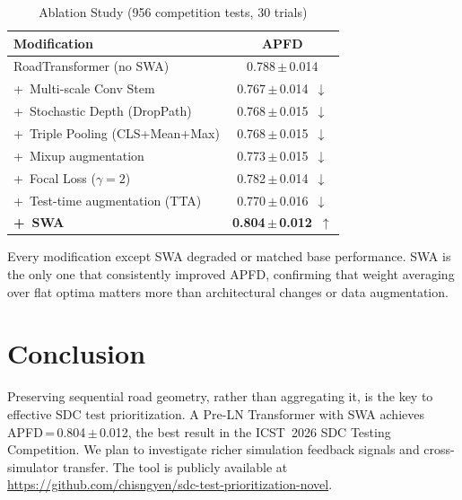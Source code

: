 \documentclass[conference]{IEEEtran}
\newcommand{\softred}[1]{\textcolor{red!70!black}{#1}}
\newcommand{\softgreen}[1]{\textcolor{green!60!black}{#1}}
\begin{document}
\begin{table}[t]
\caption{Ablation Study (956 competition tests, 30 trials)}
\vspace{-4pt}
\begin{center}{\small
\setlength{\tabcolsep}{3pt}
\begin{tabular}{lc}
\toprule
\textbf{Modification} & \textbf{APFD} \\
\midrule
RoadTransformer (no SWA)        & 0.788\,$\pm$\,0.014 \\
\midrule
+~Multi-scale Conv Stem         & \softred{0.767\,$\pm$\,0.014~$\downarrow$} \\
+~Stochastic Depth (DropPath)   & \softred{0.768\,$\pm$\,0.015~$\downarrow$} \\
+~Triple Pooling (CLS+Mean+Max) & \softred{0.768\,$\pm$\,0.015~$\downarrow$} \\
+~Mixup augmentation            & \softred{0.773\,$\pm$\,0.015~$\downarrow$} \\
+~Focal Loss ($\gamma{=}2$)~\cite{b9} & \softred{0.782\,$\pm$\,0.014~$\downarrow$} \\
+~Test-time augmentation (TTA)  & \softred{0.770\,$\pm$\,0.016~$\downarrow$} \\
\textbf{+~SWA}                  & \textbf{\softgreen{0.804\,$\pm$\,0.012~$\uparrow$}} \\
\bottomrule
\end{tabular}}
\label{tab:ablation}
\end{center}
\vspace{-6pt}
\end{table}

Every modification except SWA degraded or matched base performance.
SWA is the only one that consistently improved APFD, confirming that weight averaging over flat optima matters more than architectural changes or data augmentation.

\section{Conclusion}

Preserving sequential road geometry, rather than aggregating it, is the key to effective SDC test prioritization.
A Pre-LN Transformer with SWA achieves APFD\,=\,0.804\,$\pm$\,0.012, the best result in the ICST~2026 SDC Testing Competition.
We plan to investigate richer simulation feedback signals and cross-simulator transfer.
The tool is publicly available at \url{https://github.com/chisngyen/sdc-test-prioritization-novel}.
\end{document}
